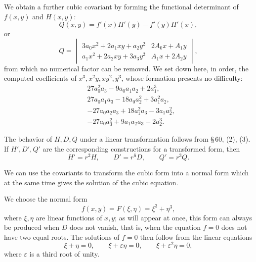 \documentclass[11pt]{article}
\begin{document}
We obtain a further cubic covariant by forming the functional determinant of $f(x,y)$ and $H(x,y)$:
\begin{equation}
 Q(x,y)=f'(x)H'(y)-f'(y)H'(x),
\tag{6}
\end{equation}
or
\begin{equation}
 Q=\begin{vmatrix}
 3a_0x^2+2a_1xy+a_2y^2 & 2A_0x+A_1y\\
 a_1x^2+2a_2xy+3a_3y^2 & A_1x+2A_2y
 \end{vmatrix},
\tag{7}
\end{equation}
from which no numerical factor can be removed. We set down here, in order, the computed coefficients of $x^3,x^2y,xy^2,y^3$, whose formation presents no difficulty:
\[
\begin{aligned}
 &27a_0^2a_3-9a_0a_1a_2+2a_1^3,\\
 &27a_0a_1a_3-18a_0a_2^2+3a_1^2a_2,\\
 &-27a_0a_2a_3+18a_1^2a_3-3a_1a_2^2,\\
 &-27a_0a_3^2+9a_1a_2a_3-2a_2^3.
\end{aligned}
\]

The behavior of $H,D,Q$ under a linear transformation follows from \S\,60, (2), (3). If $H',D',Q'$ are the corresponding constructions for a transformed form, then
\begin{equation}
 H'=r^2H,\qquad D'=r^6D,\qquad Q'=r^3Q.
\tag{8}
\end{equation}

We can use the covariants to transform the cubic form into a normal form which at the same time gives the solution of the cubic equation.

We choose the normal form
\begin{equation}
 f(x,y)=F(\xi,\eta)=\xi^3+\eta^3,
\tag{9}
\end{equation}
where $\xi,\eta$ are linear functions of $x,y$; as will appear at once, this form can always be produced when $D$ does not vanish, that is, when the equation $f=0$ does not have two equal roots. The solutions of $f=0$ then follow from the linear equations
\[
 \xi+\eta=0,
 \qquad \xi+\varepsilon\eta=0,
 \qquad \xi+\varepsilon^2\eta=0,
\]
where $\varepsilon$ is a third root of unity.
\end{document}
